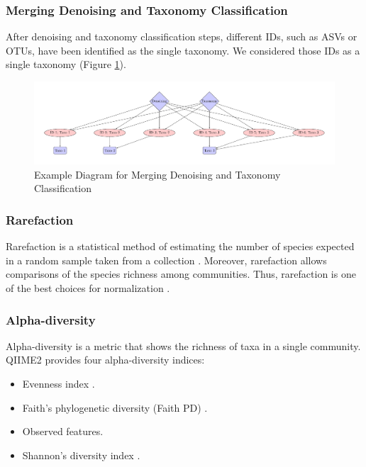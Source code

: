 \documentclass[a4paper]{article}
\begin{document}
            \subsubsection{Merging Denoising and Taxonomy Classification}
                After denoising and taxonomy classification steps, different IDs, such as ASVs or OTUs, have been identified as the single taxonomy. We considered those IDs as a single taxonomy (Figure \ref{fig:merging}).

                \begin{figure}[p]
                    \centering
                    \includegraphics[width=0.8 \linewidth]{figures/Merging/merging.pdf}
                    \caption{Example Diagram for Merging Denoising and Taxonomy Classification}
                    \label{fig:merging}
                \end{figure}

            \subsubsection{Rarefaction}
                Rarefaction is a statistical method of estimating the number of species expected in a random sample taken from a collection \cite{rarefaction1}. Moreover, rarefaction allows comparisons of the species richness among communities. Thus, rarefaction is one of the best choices for normalization \cite{rarefaction2}.

            \subsubsection{Alpha-diversity}
                Alpha-diversity is a metric that shows the richness of taxa in a single community. QIIME2 provides four alpha-diversity indices:
                \begin{itemize}
                    \item Evenness index \cite{evenness1}.
                    \item Faith's phylogenetic diversity (Faith PD) \cite{faith1}.
                    \item Observed features.
                    \item Shannon's diversity index \cite{shannon1}.
                \end{itemize}
\end{document}
